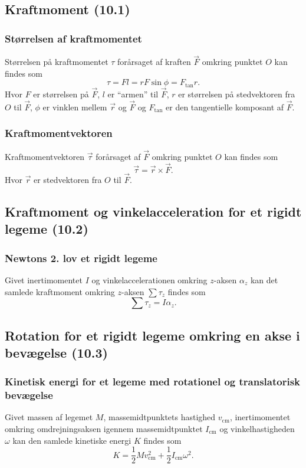 \subsection{Kraftmoment (10.1)}

\subsubsection{Størrelsen af kraftmomentet} \label{afs:strkramom}
Størrelsen på kraftmomentet $\tau$ forårsaget af kraften $\Vec{F}$ omkring punktet $O$ kan findes som
\[ 
\tau = Fl = rF \sin\phi = F_{\text{tan}} r
.\]
Hvor $F$ er størrelsen på $\Vec{F}$, $l$ er ``armen'' til $\Vec{F}$, $r$ er størrelsen på stedvektoren fra $O$ til $\Vec{F}$, $\phi$ er vinklen mellem $\Vec{r}$ og $\Vec{F}$ og $F_{\text{tan}}$ er den tangentielle komposant af $\Vec{F}$.


\subsubsection{Kraftmomentvektoren} \label{afs:kramomvek}
Kraftmomentvektoren $\Vec{\tau}$ forårsaget af $\Vec{F}$ omkring punktet $O$ kan findes som
\[ 
\Vec{\tau} = \Vec{r} \times \Vec{F}
.\]
Hvor $\Vec{r}$ er stedvektoren fra $O$ til $\Vec{F}$.


\subsection{Kraftmoment og vinkelacceleration for et rigidt legeme (10.2)}

\subsubsection{Newtons 2. lov et rigidt legeme} \label{afs:new2rig}
Givet inertimomentet $I$ og vinkelaccelerationen omkring $z$-aksen $\alpha_z$ kan det samlede kraftmoment omkring $z$-aksen $\sum\tau_z$ findes som
\[ 
\sum \tau_z = I \alpha_z
.\]

\subsection{Rotation for et rigidt legeme omkring en akse i bevægelse (10.3)}

\subsubsection{Kinetisk energi for et legeme med rotationel og translatorisk bevægelse} \label{afs:erottrans}
Givet massen af legemet $M$, massemidtpunktets hastighed $v_{\text{cm}}$, inertimomentet omkring omdrejningsaksen igennem massemidtpunktet $I_{\text{cm}}$ og vinkelhastigheden $\omega$ kan den samlede kinetiske energi $K$ findes som
\[ 
K = \frac{1}{2}Mv_{\text{cm}}^2 + \frac{1}{2}I_{\text{cm}}\omega^2
.\]


